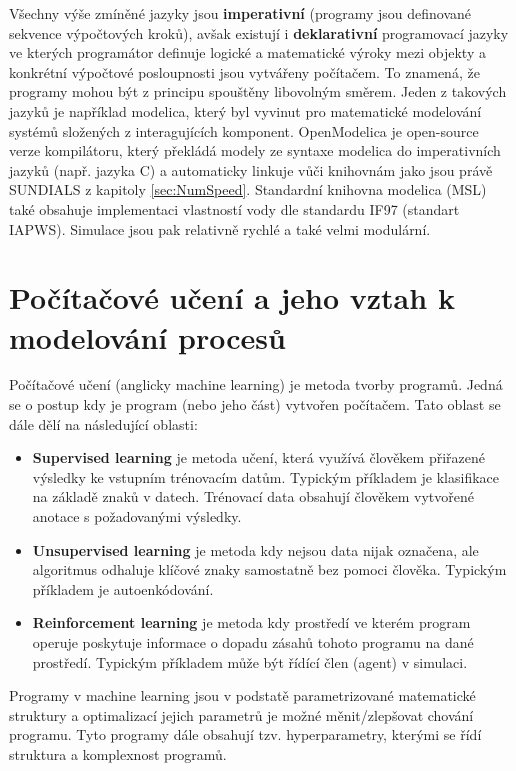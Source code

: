 Všechny výše zmíněné jazyky jsou \textbf{imperativní} (programy jsou definované
sekvence výpočtových kroků), avšak existují i \textbf{deklarativní} programovací jazyky
ve kterých programátor definuje logické a matematické výroky mezi objekty a
konkrétní výpočtové posloupnosti jsou vytvářeny počítačem. To znamená, že
programy mohou být z principu spouštěny libovolným směrem. Jeden z takových jazyků je například
modelica, který byl vyvinut pro matematické modelování systémů složených z
interagujících komponent. OpenModelica  je open-source verze
kompilátoru, který překládá modely ze syntaxe modelica do imperativních jazyků
(např. jazyka C) a automaticky linkuje vůči knihovnám jako jsou právě SUNDIALS
z kapitoly \ref{sec:NumSpeed}. Standardní knihovna modelica (MSL) také obsahuje
implementaci vlastností vody dle standardu IF97 (standart IAPWS). Simulace jsou
pak relativně rychlé a také velmi modulární.

\section{Počítačové učení a jeho vztah k modelování procesů}
\label{sec:ML}
Počítačové učení (anglicky machine learning) je metoda tvorby programů. Jedná
se o postup kdy je program (nebo jeho část) vytvořen počítačem. Tato oblast se
dále dělí na následující oblasti:
\begin{itemize}
  \item
    \textbf{Supervised learning} je metoda učení, která využívá člověkem
    přiřazené výsledky ke vstupním trénovacím datům. Typickým příkladem je
    klasifikace na základě znaků v datech. Trénovací data obsahují člověkem
    vytvořené anotace s požadovanými výsledky.
  \item
    \textbf{Unsupervised learning} je metoda kdy nejsou data nijak označena,
    ale algoritmus odhaluje klíčové znaky samostatně bez pomoci člověka.
    Typickým příkladem je autoenkódování.
  \item
    \textbf{Reinforcement learning} je metoda kdy prostředí ve kterém program
    operuje poskytuje informace o dopadu zásahů tohoto programu na dané
    prostředí. Typickým příkladem může být řídící člen (agent) v simulaci.
\end{itemize}
Programy v machine learning jsou v podstatě
parametrizované matematické struktury a optimalizací jejich parametrů je možné
měnit/zlepšovat chování programu. Tyto programy dále obsahují tzv.
hyperparametry, kterými se řídí struktura a komplexnost programů.


